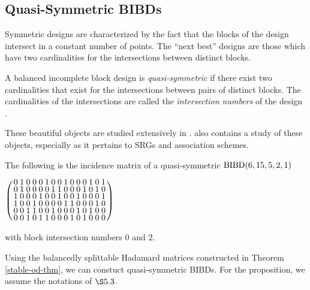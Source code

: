 \documentclass[../../../main]{subfiles}
\begin{document}
\subsection{Quasi-Symmetric BIBDs}

Symmetric designs are characterized by the fact that the blocks of the design intersect in a constant number of points. The ``next best'' designs are those which have two cardinalities for the intersections between distinct blocks.

\begin{defin}
 A balanced incomplete block design is {\it quasi-symmetric} if there exist two
 cardinalities that exist for the intersections between pairs of distinct
 blocks. The cardinalities of the intersections are called the {\it intersection
   numbers} of the design .
\end{defin}

These beautiful objects are studied extensively in \cite{quasi-symmetric-shrikhande}. \cite{combinatorics-of-symmetric-designs} also contains a study of these objects, especially as it pertains to SRGs and association schemes. 

\begin{ex}
 The following is the incidence matrix of a quasi-symmetric $\text{BIBD}(6,15,5,2,1)$
 \begin{defenum}
  \item\label{quasi-sym-ex} $
  \arraycolsep=1.25pt\def\arraystretch{0.625}
  \left(\begin{array}{rrrrrrrrrrrrrrr}
0 & 1 & 0 & 0 & 0 & 1 & 0 & 0 & 1 & 0 & 0 & 0 & 1 & 0 & 1 \\
0 & 1 & 0 & 0 & 0 & 0 & 1 & 1 & 0 & 0 & 0 & 1 & 0 & 1 & 0 \\
1 & 0 & 0 & 0 & 1 & 0 & 0 & 1 & 0 & 0 & 1 & 0 & 0 & 0 & 1 \\
1 & 0 & 0 & 1 & 0 & 0 & 0 & 0 & 1 & 1 & 0 & 0 & 0 & 1 & 0 \\
0 & 0 & 1 & 1 & 0 & 0 & 1 & 0 & 0 & 0 & 1 & 0 & 1 & 0 & 0 \\
0 & 0 & 1 & 0 & 1 & 1 & 0 & 0 & 0 & 1 & 0 & 1 & 0 & 0 & 0
\end{array}\right)
  $
 \end{defenum}
 with block intersection numbers 0 and 2.
\end{ex}

Using the balancedly splittable Hadamard matrices constructed in Theorem \ref{stable-od-thm}, we can constuct quasi-symmetric BIBDs. For the proposition, we assume the notations of $\S5.3$.
\end{document}
